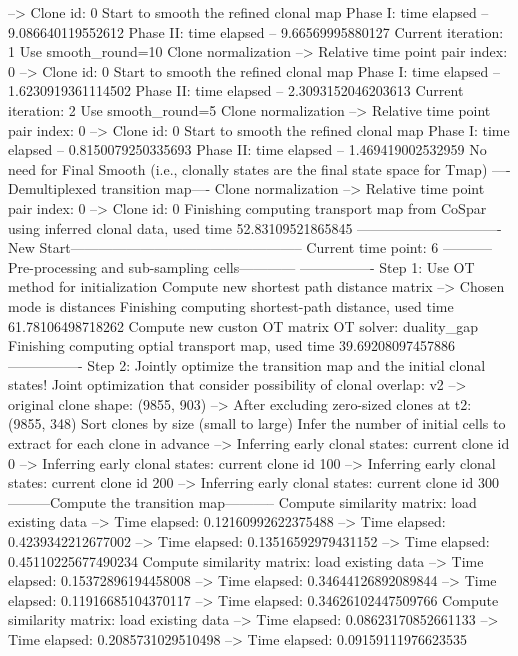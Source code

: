 \documentclass[letterpaper,10pt,english]{sphinxmanual}
\begin{document}
{\begin{sphinxVerbatim}[commandchars=\\\{\}]
--> Clone id: 0
Start to smooth the refined clonal map
Phase I: time elapsed --  9.086640119552612
Phase II: time elapsed --  9.66569995880127
Current iteration: 1
Use smooth\_round=10
Clone normalization
--> Relative time point pair index: 0
--> Clone id: 0
Start to smooth the refined clonal map
Phase I: time elapsed --  1.6230919361114502
Phase II: time elapsed --  2.3093152046203613
Current iteration: 2
Use smooth\_round=5
Clone normalization
--> Relative time point pair index: 0
--> Clone id: 0
Start to smooth the refined clonal map
Phase I: time elapsed --  0.8150079250335693
Phase II: time elapsed --  1.469419002532959
No need for Final Smooth (i.e., clonally states are the final state space for Tmap)
----Demultiplexed transition map----
Clone normalization
--> Relative time point pair index: 0
--> Clone id: 0
Finishing computing transport map from CoSpar using inferred clonal data, used time 52.83109521865845
-------------------------------New Start--------------------------------------------------
Current time point: 6
-----------Pre-processing and sub-sampling cells------------
----------------
Step 1: Use OT method for initialization
Compute new shortest path distance matrix
--> Chosen mode is distances
Finishing computing shortest-path distance, used time 61.78106498718262
Compute new custon OT matrix
OT solver: duality\_gap
Finishing computing optial transport map, used time 39.69208097457886
----------------
Step 2: Jointly optimize the transition map and the initial clonal states!
Joint optimization that consider possibility of clonal overlap: v2
--> original clone shape: (9855, 903)
--> After excluding zero-sized clones at t2: (9855, 348)
Sort clones by size (small to large)
Infer the number of initial cells to extract for each clone in advance
--> Inferring early clonal states: current clone id 0
--> Inferring early clonal states: current clone id 100
--> Inferring early clonal states: current clone id 200
--> Inferring early clonal states: current clone id 300
---------Compute the transition map-----------
Compute similarity matrix: load existing data
--> Time elapsed:  0.12160992622375488
--> Time elapsed:  0.4239342212677002
--> Time elapsed:  0.13516592979431152
--> Time elapsed:  0.45110225677490234
Compute similarity matrix: load existing data
--> Time elapsed:  0.15372896194458008
--> Time elapsed:  0.34644126892089844
--> Time elapsed:  0.11916685104370117
--> Time elapsed:  0.34626102447509766
Compute similarity matrix: load existing data
--> Time elapsed:  0.08623170852661133
--> Time elapsed:  0.2085731029510498
--> Time elapsed:  0.09159111976623535

\end{sphinxVerbatim}}
\end{document}

